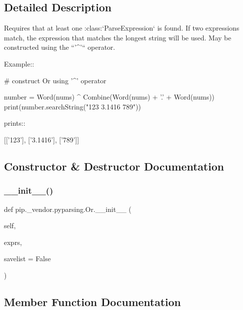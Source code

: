 \subsection{Detailed Description}
\begin{DoxyVerb}Requires that at least one :class:`ParseExpression` is found. If
two expressions match, the expression that matches the longest
string will be used. May be constructed using the ``'^'``
operator.

Example::

    # construct Or using '^' operator

    number = Word(nums) ^ Combine(Word(nums) + '.' + Word(nums))
    print(number.searchString("123 3.1416 789"))

prints::

    [['123'], ['3.1416'], ['789']]
\end{DoxyVerb}
 

\subsection{Constructor \& Destructor Documentation}
\mbox{\label{classpip_1_1__vendor_1_1pyparsing_1_1Or_aaaa9f1d796252b37fe1450d8e571ffd5}} 
\subsubsection{\texorpdfstring{\+\_\+\+\_\+init\+\_\+\+\_\+()}{\_\_init\_\_()}}
{\footnotesize\ttfamily def pip.\+\_\+vendor.\+pyparsing.\+Or.\+\_\+\+\_\+init\+\_\+\+\_\+ (\begin{DoxyParamCaption}\item[{}]{self,  }\item[{}]{exprs,  }\item[{}]{savelist = {\ttfamily False} }\end{DoxyParamCaption})}



\subsection{Member Function Documentation}
\mbox{\label{classpip_1_1__vendor_1_1pyparsing_1_1Or_aaf839e2959fe88953c3026226a1c9e99}} 
